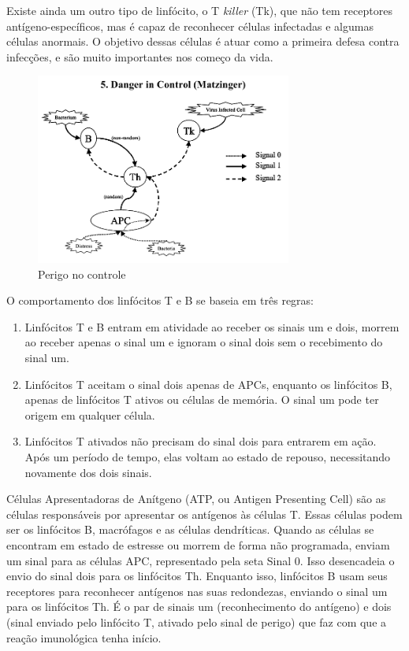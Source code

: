 Existe ainda um outro tipo de linfócito, o T \emph{killer} (Tk), que não tem receptores antígeno-específicos, mas é capaz de reconhecer células infectadas e algumas células anormais. O objetivo dessas células é atuar como a primeira defesa contra infecções, e são muito importantes nos começo da vida.

\begin{figure}[h!]
\centering
\includegraphics[width=0.75\textwidth]{img/signals5-danger.png}
\caption{Perigo no controle}
\label{img:signals-last}
\end{figure}

O comportamento dos linfócitos T e B se baseia em três regras:

\begin{enumerate}
\item Linfócitos T e B entram em atividade ao receber os sinais um e dois, morrem ao receber apenas o sinal um e ignoram o sinal dois sem o recebimento do sinal um.
\item Linfócitos T aceitam o sinal dois apenas de APCs, enquanto os linfócitos B, apenas de linfócitos T ativos ou células de memória. O sinal um pode ter origem em qualquer célula.
\item Linfócitos T ativados não precisam do sinal dois para entrarem em ação. Após um período de tempo, elas voltam ao estado de repouso, necessitando novamente dos dois sinais.
\end{enumerate}

Células Apresentadoras de Anítgeno (ATP, ou Antigen Presenting Cell) são as células responsáveis por apresentar os antígenos às células T. Essas células podem ser os linfócitos B, macrófagos e as células dendríticas. Quando as células se encontram em estado de estresse ou morrem de forma não programada, enviam um sinal para as células APC, representado pela seta Sinal 0. Isso desencadeia o envio do sinal dois para os linfócitos Th. Enquanto isso, linfócitos B usam seus receptores para reconhecer antígenos nas suas redondezas, enviando o sinal um para os linfócitos Th. É o par de sinais um (reconhecimento do antígeno) e dois (sinal enviado pelo linfócito T, ativado pelo sinal de perigo) que faz com que a reação imunológica tenha início.

